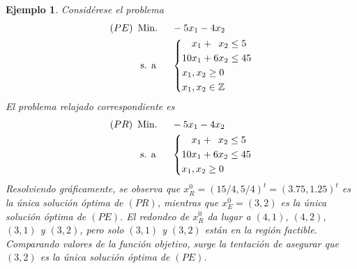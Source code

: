 \documentclass[11pt]{report}
\theoremstyle{mytheorem}
\theoremstyle{mydefinition}
\theoremstyle{myexample}
\newtheorem*{example}{Ejemplo}
\newcommand{\Z}{\mathbb Z}
\begin{document}
\begin{example}
Considérese el problema
\[\begin{aligned}[t]
(PE)\ \,&\text{Min. } && -5x_1-4x_2 \\
& \; \text{s. a} &&\left\{\begin{alignedat}{10}
&   &x_1 & {}+{} &  &x_2 & {}\leq{} &5 \\
& 10&x_1 & {}+{} & 6&x_2 & {}\leq{} &45 \\
&\mathrlap{x_1,x_2 \geq 0} \\
&\mathrlap{x_1,x_2 \in \Z}
\end{alignedat}\right.
\end{aligned}\]
El problema relajado correspondiente es
\[\begin{aligned}[t]
(PR) \ \,&\text{Min. } && -5x_1-4x_2 \\
& \; \text{s. a} &&\left\{\begin{alignedat}{10}
&   &x_1 & {}+{} &  &x_2 & {}\leq{} &5 \\
& 10&x_1 & {}+{} & 6&x_2 & {}\leq{} &45 \\
&\mathrlap{x_1,x_2 \geq 0}
\end{alignedat}\right.
\end{aligned}\]
Resolviendo gráficamente, se observa que $x^0_{R} = (15/4,5/4)^t = (3.75,1.25)^t$ es la única solución óptima de $(PR)$, mientras que $x^0_E=(3,2)$ es la única solución óptima de $(PE)$. El redondeo de $x^0_R$ da lugar a $(4,1)$, $(4,2)$, $(3,1)$ y $(3,2)$, pero solo $(3,1)$ y $(3,2)$ están en la región factible. Comparando valores de la función objetivo, surge la tentación de asegurar que $(3,2)$ es la única solución óptima de $(PE)$.
\end{example}
\end{document}
